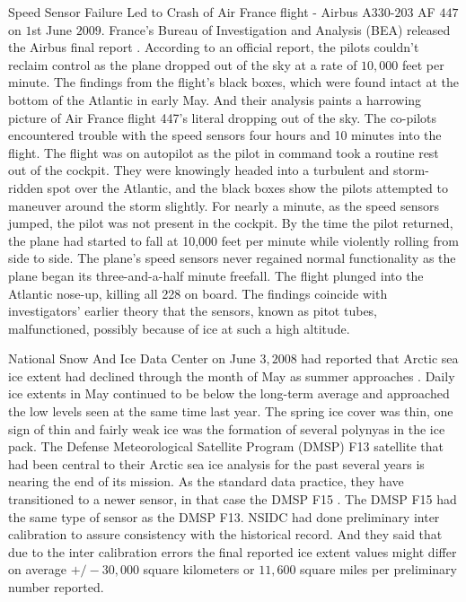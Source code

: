 	Speed Sensor Failure Led to Crash of Air France flight - Airbus A$330$-$203$ AF $447$ on $1$st June $2009$.
	France's Bureau of Investigation and Analysis (BEA) released the Airbus final report \cite{final-report}.
	According to an official report, the pilots couldn't reclaim control as the plane dropped out of the sky at a rate of $10,000$ feet per minute.
	The findings from the flight's black boxes, which were found intact at the bottom of the Atlantic in early May.
	And their analysis paints a harrowing picture of Air France flight 447's literal dropping out of the sky.
	The co-pilots encountered trouble with the speed sensors four hours and 10 minutes into the flight. 
	The flight was on autopilot as the pilot in command took a routine rest out of the cockpit. 
	They were knowingly headed into a turbulent and storm-ridden spot over the Atlantic, and the black boxes show the pilots attempted to maneuver around the storm slightly.
	For nearly a minute, as the speed sensors jumped, the pilot was not present in the cockpit. 
	By the time the pilot returned, the plane had started to fall at 10,000 feet per minute while violently rolling from side to side.
	The plane's speed sensors never regained normal functionality as the plane began its three-and-a-half minute freefall.
	The flight plunged into the Atlantic nose-up, killing all 228 on board.
	The findings coincide with investigators' earlier theory that the sensors, known as pitot tubes, malfunctioned, possibly because of ice at such a high altitude.

	National Snow And Ice Data Center on June $3, 2008$ had reported that Arctic sea ice extent had declined through the month of May as summer approaches \cite{nsidc}. 
	Daily ice extents in May continued to be below the long-term average and approached the low levels seen at the same time last year.
	The spring ice cover was thin, one sign of thin and fairly weak ice was the formation of several polynyas in the ice pack.
	The Defense Meteorological Satellite Program (DMSP) F13 \cite{dmsp-f13} satellite that had been central to their Arctic sea ice analysis for the past several years is nearing the end of its mission.
	As the standard data practice, they have transitioned to a newer sensor, in that case the DMSP F15 \cite{dmsp-f15}. 
	The DMSP F15 had the same type of sensor as the DMSP F13. 
	NSIDC had done preliminary inter calibration to assure consistency with the historical record. 
	And they said that due to the inter calibration errors the final reported ice extent values might differ on average $+/- 30,000$ square kilometers or $11,600$ square miles per preliminary number reported.

